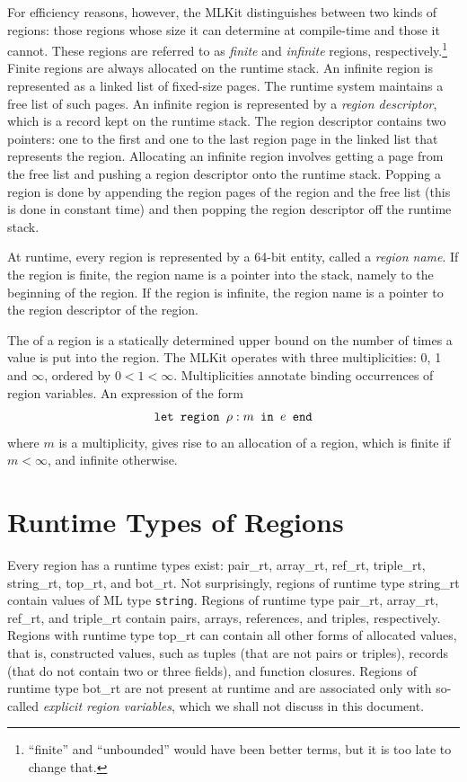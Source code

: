 \documentclass[12pt]{book}
\begin{document}
For efficiency reasons, however, the MLKit distinguishes between two
kinds of regions: those regions whose size it can determine at
compile-time and those it cannot.
%
These regions are referred to as
%
{\em finite} and
%
{\em infinite} regions, respectively.\footnote{``finite'' and
  ``unbounded'' would have been better terms, but it is too late to
  change that.}  Finite regions are always allocated on the
%
runtime stack.  An infinite region is represented as a linked list of
fixed-size
%
pages.  The runtime system maintains a free list of such pages. An
infinite region is represented by a
%
{\em region descriptor}, which is a record kept on the runtime stack.
The region descriptor contains two pointers: one to the first and one
to the last region page in the linked list that represents the region.
Allocating an infinite region involves getting a page from the
%
free list and pushing a region descriptor onto the
runtime stack. Popping a region is done by appending the region pages
of the region and the free list (this is done in constant time) and
then popping the region descriptor off the runtime stack.

At runtime, every region is represented by a 64-bit entity, called a
%
{\em region name}. If the region is finite, the region name is a
pointer into the stack, namely to the beginning of the region. If the
region is infinite, the region name is a pointer to the region
descriptor of the region.

The  of a region is a statically
determined upper bound on the number of times a value is put into the
region. The MLKit operates with three multiplicities: 0, 1 and $\infty$,
ordered by $0<1<\infty$. Multiplicities annotate binding occurrences
of region variables. An expression of the form
$$\hbox{\tt let region $\rho:m$ in $e$ end}$$
where $m$ is a multiplicity,
gives rise to an allocation of a region, which is finite if $m<\infty$, and
infinite otherwise.

\section{Runtime Types of Regions}
\label{runtimetypes.sec}
Every region has a %
runtime types exist: {\sc pair\_rt}, {\sc array\_rt}, {\sc ref\_rt},
{\sc triple\_rt}, {\sc string\_rt}, {\sc top\_rt}, and {\sc
  bot\_rt}. Not surprisingly, regions of runtime type {\sc string\_rt}
contain values of ML type {\tt string}. Regions of runtime type {\sc
  pair\_rt}, {\sc array\_rt}, {\sc ref\_rt}, and {\sc triple\_rt}
contain pairs, arrays, references, and triples, respectively.  Regions
with runtime type {\sc top\_rt} can contain all other forms of
allocated values, that is, constructed values, such as tuples (that
are not pairs or triples), records (that do not contain two or three
fields), and function closures. Regions of runtime type {\sc bot\_rt}
are not present at runtime and are associated only with so-called
\emph{explicit region variables}, which we shall not discuss in this
document.
\end{document}
